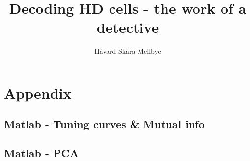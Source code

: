 \documentclass[]{article}
\title{Decoding HD cells - the work of a detective}
\author{Håvard Skåra Mellbye}
\begin{document}
\maketitle







\printbibliography
\section{Appendix}
\subsection{Matlab - Tuning curves \& Mutual info}

\subsection{Matlab - PCA}

\end{document}
